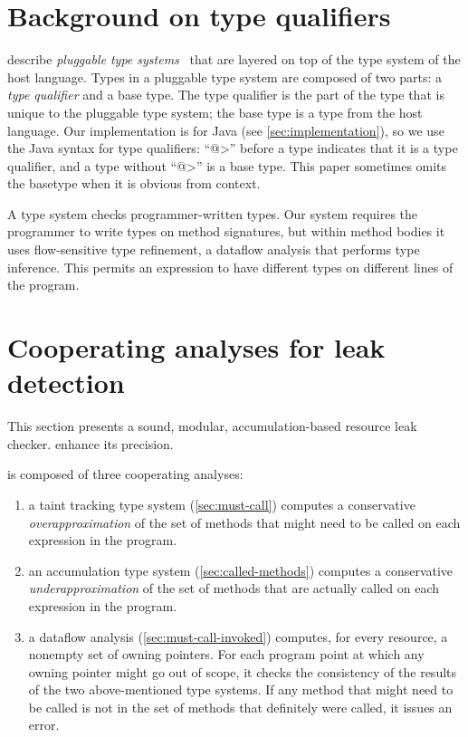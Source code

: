 \section{Background on type qualifiers}
\label{sec:background}

 describe
\emph{pluggable type systems}~\cite{FosterFFA99}
that are layered on top of the type system of the host
language.  Types in a pluggable type system are composed of two parts:
a \emph{type qualifier} and a base type. The type qualifier is the
part of the type that is unique to the pluggable type system; the base
type is a type from the host language. Our implementation is for Java
(see \cref{sec:implementation}), so we use the Java syntax for type
qualifiers: ``\<@>'' before a type indicates that it is a type
qualifier, and a type without ``\<@>'' is a base type.
This paper sometimes omits the basetype when it is obvious from context.

A type system checks programmer-written types.  Our system requires the
programmer to write types on method signatures, but within method bodies it
uses flow-sensitive type refinement, a dataflow analysis that performs type
inference.  This permits an expression to have different types on different
lines of the program.



\section{Cooperating analyses for leak detection}
\label{sec:base-type-systems}

This section presents a sound, modular, accumulation-based
resource leak checker.
enhance its precision.

\Tool is composed of three cooperating analyses:
\begin{enumerate}
\item a taint tracking type system (\cref{sec:must-call}) computes a conservative
  \emph{overapproximation} of the set of methods that might need to be called
  on each expression in the program.
\item an accumulation type system (\cref{sec:called-methods}) computes
  a conservative \emph{underapproximation} of the set of methods that are
  actually called on each expression in the program.
\item a dataflow analysis (\cref{sec:must-call-invoked}) computes, for
  every resource, a nonempty set of owning pointers.
  For each program point at which any owning pointer might go out of scope,
  it checks the consistency of the results of the two above-mentioned type systems.
  If any method that might need to be called is not in the set of methods
  that definitely were called, it issues an error.
\end{enumerate}


